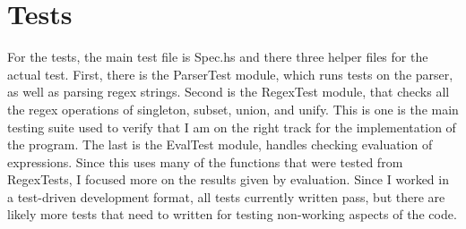 \documentclass[letterpaper, 11pt]{article}
\begin{document}
\section{Tests}\label{sec:tests}
For the tests, the main test file is Spec.hs and there three helper files for the actual test. 
First, there is the ParserTest module, which runs tests on the parser, as well as parsing regex strings. 
Second is the RegexTest module, that checks all the regex operations of singleton, subset, union, and unify.
This is one is the main testing suite used to verify that I am on the right track for the implementation of the program.
The last is the EvalTest module, handles checking evaluation of expressions.
Since this uses many of the functions that were tested from RegexTests, I focused more on the results given by evaluation.
Since I worked in a test-driven development format, all tests currently written pass, but there are likely more tests that need to written for testing non-working aspects of the code.


\end{document}
